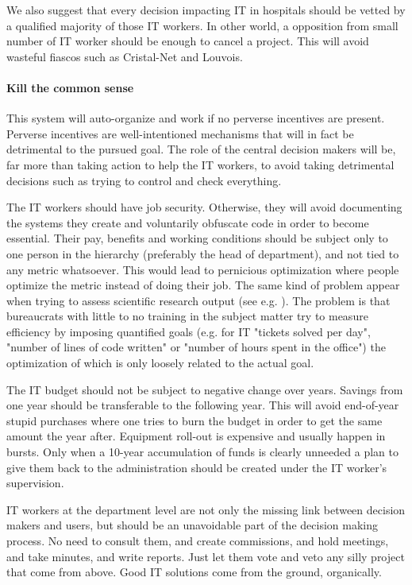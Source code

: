 \documentclass[nobib]{tufte-handout}
\begin{document}
We also suggest that every decision impacting IT in hospitals should be vetted by a qualified majority of those IT workers. In other world, a opposition from small number of IT worker should be enough to cancel a project. This will avoid wasteful fiascos such as Cristal-Net and Louvois.

\paragraph{Kill the common sense} 

This system will auto-organize and work if no perverse incentives are present. Perverse incentives are well-intentioned mechanisms that will in fact be detrimental to the pursued goal. The role of the central decision makers will be, far more than taking action to help the IT workers, to avoid taking detrimental decisions such as trying to control and check everything.

The IT workers should have job security. Otherwise, they will avoid documenting the systems they create and voluntarily obfuscate code in order to become essential. Their pay, benefits and working conditions should be subject only to one person in the hierarchy (preferably the head of department), and not tied to any metric whatsoever. This would lead to pernicious optimization where people optimize the metric instead of doing their job. The same kind of problem appear when trying to assess scientific research output (see e.g. \cite{dora}). The problem is that bureaucrats with little to no training in the subject matter try to measure efficiency by imposing quantified goals (e.g. for IT "tickets solved per day", "number of lines of code written" or "number of hours spent in the office") the optimization of which is only loosely related to the actual goal.

The IT budget should not be subject to negative change over years. Savings from one year should be transferable to the following year. This will avoid end-of-year stupid purchases where one tries to burn the budget in order to get the same amount the year after. Equipment roll-out is expensive and usually happen in bursts. Only when a 10-year accumulation of funds is clearly unneeded a plan to give them back to the administration should be created under the IT worker's supervision.

IT workers at the department level are not only the missing link between decision makers and users, but should be an unavoidable part of the decision making process. No need to consult them, and create commissions, and hold meetings, and take minutes, and write reports. Just let them vote and veto any silly project that come from above. Good IT solutions come from the ground, organically.
\end{document}
